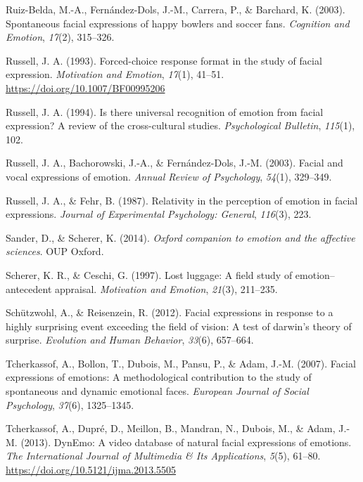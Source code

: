 \documentclass[man]{apa6}
\begin{document}
\leavevmode\hypertarget{ref-ruiz2003spontaneous}{}%
Ruiz-Belda, M.-A., Fernández-Dols, J.-M., Carrera, P., \& Barchard, K. (2003). Spontaneous facial expressions of happy bowlers and soccer fans. \emph{Cognition and Emotion}, \emph{17}(2), 315--326.

\leavevmode\hypertarget{ref-russell1993forced}{}%
Russell, J. A. (1993). Forced-choice response format in the study of facial expression. \emph{Motivation and Emotion}, \emph{17}(1), 41--51. \url{https://doi.org/10.1007/BF00995206}

\leavevmode\hypertarget{ref-russell1994there}{}%
Russell, J. A. (1994). Is there universal recognition of emotion from facial expression? A review of the cross-cultural studies. \emph{Psychological Bulletin}, \emph{115}(1), 102.

\leavevmode\hypertarget{ref-russell2003facial}{}%
Russell, J. A., Bachorowski, J.-A., \& Fernández-Dols, J.-M. (2003). Facial and vocal expressions of emotion. \emph{Annual Review of Psychology}, \emph{54}(1), 329--349.

\leavevmode\hypertarget{ref-russell1987relativity}{}%
Russell, J. A., \& Fehr, B. (1987). Relativity in the perception of emotion in facial expressions. \emph{Journal of Experimental Psychology: General}, \emph{116}(3), 223.

\leavevmode\hypertarget{ref-sander2014oxford}{}%
Sander, D., \& Scherer, K. (2014). \emph{Oxford companion to emotion and the affective sciences}. OUP Oxford.

\leavevmode\hypertarget{ref-scherer1997lost}{}%
Scherer, K. R., \& Ceschi, G. (1997). Lost luggage: A field study of emotion--antecedent appraisal. \emph{Motivation and Emotion}, \emph{21}(3), 211--235.

\leavevmode\hypertarget{ref-schutzwohl2012facial}{}%
Schützwohl, A., \& Reisenzein, R. (2012). Facial expressions in response to a highly surprising event exceeding the field of vision: A test of darwin's theory of surprise. \emph{Evolution and Human Behavior}, \emph{33}(6), 657--664.

\leavevmode\hypertarget{ref-tcherkassof2007facial}{}%
Tcherkassof, A., Bollon, T., Dubois, M., Pansu, P., \& Adam, J.-M. (2007). Facial expressions of emotions: A methodological contribution to the study of spontaneous and dynamic emotional faces. \emph{European Journal of Social Psychology}, \emph{37}(6), 1325--1345.

\leavevmode\hypertarget{ref-tcherkassof2013dynemo}{}%
Tcherkassof, A., Dupré, D., Meillon, B., Mandran, N., Dubois, M., \& Adam, J.-M. (2013). DynEmo: A video database of natural facial expressions of emotions. \emph{The International Journal of Multimedia \& Its Applications}, \emph{5}(5), 61--80. \url{https://doi.org/10.5121/ijma.2013.5505}
\end{document}
